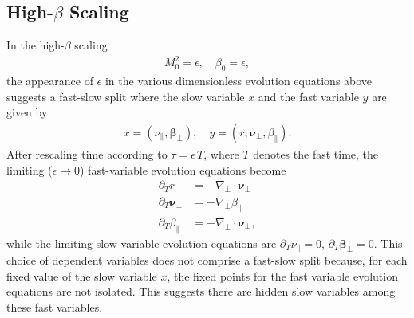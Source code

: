 \documentclass{article}
\newcommand{\ep}{\epsilon}
\newcommand{\np}{\nabla_\perp}
\begin{document}
\subsection{High-$\beta$ Scaling}
In the high-$\beta$ scaling
\begin{align*}
    M_0^2 = \ep,\quad \beta_0 = \ep,
\end{align*}
the appearance of $\ep$ in the various dimensionless evolution equations above suggests a fast-slow split where the slow variable $x$ and the fast variable $y$ are given by
\begin{align*}
x = (\nu_\parallel,\bm{\beta}_\perp), \quad y = (r,\bm{\nu}_\perp,\beta_\parallel).
\end{align*}
After rescaling time according to $\tau = \epsilon\,T$, where $T$ denotes the fast time, the limiting ($\epsilon\rightarrow 0$) fast-variable evolution equations become
\begin{align*}
\partial_Tr & = -\np\cdot\bm{\nu}_\perp\\
\partial_T\bm{\nu}_\perp & = -\np\beta_\parallel\\
\partial_T\beta_\parallel & = -\np\cdot\bm{\nu}_\perp,
\end{align*}
while the limiting slow-variable evolution equations are $\partial_T\nu_\parallel = 0$, $\partial_T\bm{\beta}_\perp = 0$. This choice of dependent variables does not comprise a fast-slow split because, for each fixed value of the slow variable $x$, the fixed points for the fast variable evolution equations are not isolated. This suggests there are hidden slow variables among these fast variables.
\end{document}
